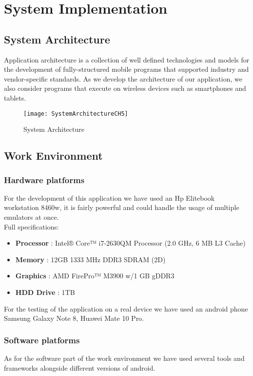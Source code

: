 \chapter{System Implementation} \label{chap:sysImplementation}

\section{System Architecture}
Application architecture is a collection of well defined technologies and models for the development of fully-structured mobile programs that supported industry and vendor-specific standards. As we develop the architecture of our application, we also consider programs that execute on wireless devices such as smartphones and tablets.

\begin{figure}[ht]
\center
\texttt{[image: SystemArchitectureCH5]}
\caption{System Architecture}
\label{fig:System Architecture}
\end{figure}

\section{Work Environment}

\subsection{Hardware platforms}
For the development of this application we have used an Hp Elitebook workstation 8460w, it is fairly powerful and could handle the usage of multiple emulators at once.
\\ Full specifications:

\begin{itemize}
\item \textbf{Processor} : Intel® Core™ i7-2630QM Processor (2.0 GHz, 6 MB L3 Cache)
\item \textbf{Memory }: 12GB 1333 MHz DDR3 SDRAM (2D)
\item \textbf{Graphics }: AMD FirePro™ M3900 w/1 GB gDDR3
\item \textbf{HDD Drive }: 1TB
\end{itemize}

For the testing of the application on a real device we have used an android phone Samsung Galaxy Note 8, Huawei Mate 10 Pro.

\subsection{Software platforms}
As for the software part of the work environment we have used several tools and frameworks alongside different versions of android.

